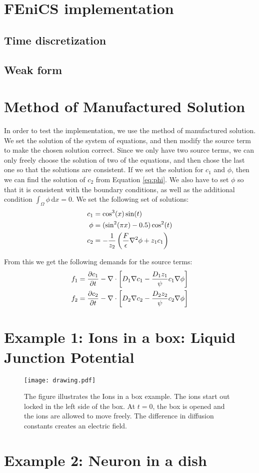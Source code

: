 \documentclass[12pt]{article}
\begin{document}
\section{FEniCS implementation}

\subsection{Time discretization}

\subsection{Weak form}

\section{Method of Manufactured Solution}
In order to test the implementation, we use the method of manufactured solution. We set the solution of the system of equations, and then modify the source term to make the chosen solution correct. Since we only have two source terms, we can only freely choose the solution of two of the equations, and then chose the last one so that the solutions are consistent. If we set the solution for $c_1$ and $\phi$, then we can find the solution of $c_2$ from Equation \eqref{eq:phi}. We also have to set $\phi$ so that it is consistent with the boundary conditions, as well as the additional condition $\int_\Omega \phi\, \text{d}x = 0$. We set the following set of solutions:
\begin{align}
c_1 &= \cos^3(x) \sin(t) \\ 
\phi &= (\sin^2(\pi x) - 0.5)\cos^2(t) \\
c_2 & = -{1\over z_2} \left( {F \over \epsilon}\nabla^2\phi + z_1c_1\right)
\end{align}

From this we get the following demands for the source terms: 
\begin{align}
f_1 & = {\partial c_1 \over \partial t} - \nabla \cdot\left[ D_1 \nabla c_1 - {D_1z_1 \over \psi} c_1 \nabla \phi \right] \\ 
f_2 & = {\partial c_2 \over \partial t} - \nabla \cdot\left[ D_2 \nabla c_2 - {D_2z_2 \over \psi} c_2 \nabla \phi \right]
\end{align}

\section{Example 1: Ions in a box: Liquid Junction Potential}
\begin{figure}[h]
\centering
\texttt{[image: drawing.pdf]}
\label{fig:ljp}
\caption{The figure illustrates the Ions in a box example. The ions start out locked in the left side of the box. At $t=0$, the box is opened and the ions are allowed to move freely. The difference in diffusion constants creates an electric field.}
\end{figure}



\section{Example 2: Neuron in a dish}
\end{document}
